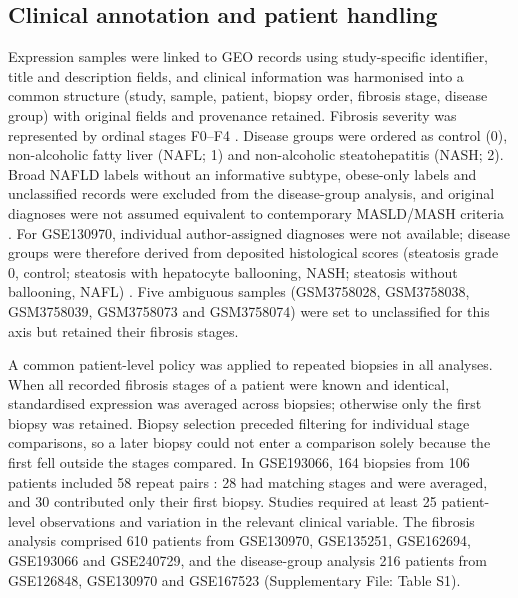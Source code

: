 \documentclass[11pt,a4paper]{article}
\begin{document}
\subsection*{Clinical annotation and patient handling}
Expression samples were linked to GEO records using study-specific identifier, title and description fields, and clinical information was harmonised into a common structure (study, sample, patient, biopsy order, fibrosis stage, disease group) with original fields and provenance retained. Fibrosis severity was represented by ordinal stages F0--F4 \cite{kleiner2005}. Disease groups were ordered as control (0), non-alcoholic fatty liver (NAFL; 1) and non-alcoholic steatohepatitis (NASH; 2). Broad NAFLD labels without an informative subtype, obese-only labels and unclassified records were excluded from the disease-group analysis, and original diagnoses were not assumed equivalent to contemporary MASLD/MASH criteria \cite{rinella2023}. For GSE130970, individual author-assigned diagnoses were not available; disease groups were therefore derived from deposited histological scores (steatosis grade 0, control; steatosis with hepatocyte ballooning, NASH; steatosis without ballooning, NAFL) \cite{hoang2019}. Five ambiguous samples (GSM3758028, GSM3758038, GSM3758039, GSM3758073 and GSM3758074) were set to unclassified for this axis but retained their fibrosis stages.

A common patient-level policy was applied to repeated biopsies in all analyses. When all recorded fibrosis stages of a patient were known and identical, standardised expression was averaged across biopsies; otherwise only the first biopsy was retained. Biopsy selection preceded filtering for individual stage comparisons, so a later biopsy could not enter a comparison solely because the first fell outside the stages compared. In GSE193066, 164 biopsies from 106 patients included 58 repeat pairs \cite{fujiwara2022}: 28 had matching stages and were averaged, and 30 contributed only their first biopsy. Studies required at least 25 patient-level observations and variation in the relevant clinical variable. The fibrosis analysis comprised 610 patients from GSE130970, GSE135251, GSE162694, GSE193066 and GSE240729, and the disease-group analysis 216 patients from GSE126848, GSE130970 and GSE167523 (Supplementary File: Table S1).
\end{document}
